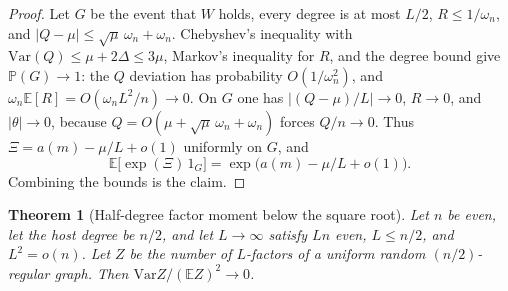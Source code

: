\documentclass[11pt]{article}
\newtheorem{theorem}{Theorem}
\newcommand{\EE}{\mathbb{E}}
\newcommand{\PP}{\mathbb{P}}
\newcommand{\Var}{\mathrm{Var}}
\begin{document}
\begin{proof}
Let \(G\) be the event that \(W\) holds, every degree is at most \(L/2\),
\(R\le 1/\omega_n\), and \(|Q-\mu|\le\sqrt{\mu}\,\omega_n+\omega_n\).
Chebyshev's inequality with \(\Var(Q)\le\mu+2\Delta\le 3\mu\), Markov's
inequality for \(R\), and the degree bound give \(\PP(G)\to 1\): the \(Q\)
deviation has probability \(O(1/\omega_n^2)\), and
\(\omega_n\EE[R]=O(\omega_n L^2/n)\to 0\).
On \(G\) one has \(|(Q-\mu)/L|\to 0\), \(R\to 0\), and \(|\theta|\to 0\),
because \(Q=O(\mu+\sqrt{\mu}\,\omega_n+\omega_n)\) forces \(Q/n\to 0\).
Thus \(\Xi=a(m)-\mu/L+o(1)\) uniformly on \(G\), and
\[
\EE\bigl[\exp(\Xi)\,1_{G}\bigr]
=
\exp\bigl(a(m)-\mu/L+o(1)\bigr).
\]
Combining the bounds is the claim.
\end{proof}

\begin{theorem}[Half-degree factor moment below the square root]
\label{thm:half-below-sqrt}
Let \(n\) be even, let the host degree be \(n/2\), and let \(L\to\infty\)
satisfy \(Ln\) even, \(L\le n/2\), and \(L^2=o(n)\).
Let \(Z\) be the number of \(L\)-factors of a uniform random \((n/2)\)-regular
graph. Then \(\Var Z/(\EE Z)^2\to 0\).
\end{theorem}
\end{document}
